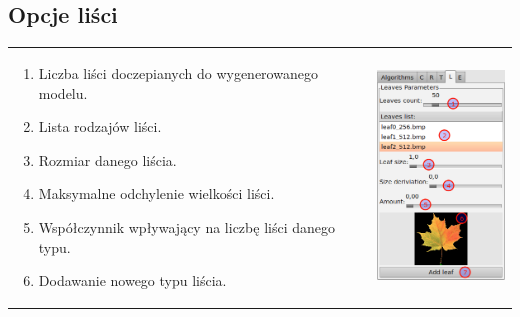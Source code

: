 \subsection{Opcje liści}
\begin{threeparttable}
\begin{tabular}{lr}
\parbox[c]{95mm}{
\begin{enumerate}
	\item {Liczba liści doczepianych do wygenerowanego modelu.}
	\item {Lista rodzajów liści.}
	\item {Rozmiar danego liścia.}
	\item {Maksymalne odchylenie wielkości liści.}
	\item {Współczynnik wpływający na liczbę liści danego typu.}
	\item {Dodawanie nowego typu liścia.}
\end{enumerate}
} &
\parbox[c]{35mm}{
\includegraphics[width=35mm]{images/gui/leaves_panel.png}
}\\
\end{tabular}
\end{threeparttable}



